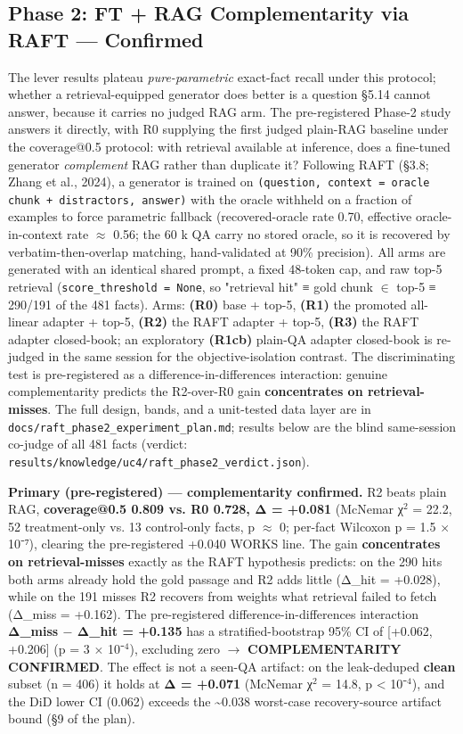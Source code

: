\documentclass[10pt,twocolumn]{article}
\begin{document}
\subsection{Phase 2: FT + RAG Complementarity via RAFT --- Confirmed}

The lever results plateau \textit{pure-parametric} exact-fact recall under this protocol; whether a retrieval-equipped generator does better is a question \S{}5.14 cannot answer, because it carries no judged RAG arm. The pre-registered Phase-2 study answers it directly, with R0 supplying the first judged plain-RAG baseline under the coverage@0.5 protocol: with retrieval available at inference, does a fine-tuned generator \textit{complement} RAG rather than duplicate it? Following RAFT (\S{}3.8; Zhang et al., 2024), a generator is trained on \texttt{(question, context = oracle chunk + distractors, answer)} with the oracle withheld on a fraction of examples to force parametric fallback (recovered-oracle rate 0.70, effective oracle-in-context rate $\approx$ 0.56; the 60 k QA carry no stored oracle, so it is recovered by verbatim-then-overlap matching, hand-validated at 90\% precision). All arms are generated with an identical shared prompt, a fixed 48-token cap, and raw top-5 retrieval (\texttt{score\_threshold = None}, so "retrieval hit" ≡ gold chunk $\in$ top-5 ≡ 290/191 of the 481 facts). Arms: \textbf{(R0)} base + top-5, \textbf{(R1)} the promoted all-linear adapter + top-5, \textbf{(R2)} the RAFT adapter + top-5, \textbf{(R3)} the RAFT adapter closed-book; an exploratory \textbf{(R1cb)} plain-QA adapter closed-book is re-judged in the same session for the objective-isolation contrast. The discriminating test is pre-registered as a difference-in-differences interaction: genuine complementarity predicts the R2-over-R0 gain \textbf{concentrates on retrieval-misses}. The full design, bands, and a unit-tested data layer are in \texttt{docs/raft\_phase2\_experiment\_plan.md}; results below are the blind same-session co-judge of all 481 facts (verdict: \texttt{results/knowledge/uc4/raft\_phase2\_verdict.json}).


\textbf{Primary (pre-registered) --- complementarity confirmed.} R2 beats plain RAG, \textbf{coverage@0.5 0.809 vs. R0 0.728, Δ = +0.081} (McNemar χ$^2$ = 22.2, 52 treatment-only vs. 13 control-only facts, p $\approx$ 0; per-fact Wilcoxon p = 1.5 $\times$ 10⁻⁷), clearing the pre-registered +0.040 WORKS line. The gain \textbf{concentrates on retrieval-misses} exactly as the RAFT hypothesis predicts: on the 290 hits both arms already hold the gold passage and R2 adds little (Δ\_hit = +0.028), while on the 191 misses R2 recovers from weights what retrieval failed to fetch (Δ\_miss = +0.162). The pre-registered difference-in-differences interaction \textbf{Δ\_miss $-$ Δ\_hit = +0.135} has a stratified-bootstrap 95\% CI of [+0.062, +0.206] (p = 3 $\times$ 10⁻$^4$), excluding zero $\to$ \textbf{COMPLEMENTARITY CONFIRMED}. The effect is not a seen-QA artifact: on the leak-deduped \textbf{clean} subset (n = 406) it holds at \textbf{Δ = +0.071} (McNemar χ$^2$ = 14.8, p < 10⁻$^4$), and the DiD lower CI (0.062) exceeds the \textasciitilde{}0.038 worst-case recovery-source artifact bound (\S{}9 of the plan).
\end{document}
